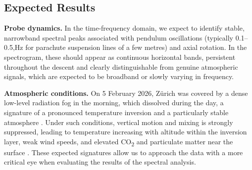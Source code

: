 \subsection{Expected Results}

\noindent  \textbf{Probe dynamics.} In the time-frequency domain, we expect to identify stable, narrowband spectral peaks associated with pendulum oscillations (typically 0.1–0.5,Hz for parachute suspension lines of a few metres) and axial rotation. In the spectrogram, these should appear as continuous horizontal bands, persistent throughout the descent and clearly distinguishable from genuine atmospheric signals, which are expected to be broadband or slowly varying in frequency.

\noindent \textbf{Atmospheric conditions.} On 5 February 2026, Zürich was covered by a dense low-level radiation fog in the morning, which dissolved during the day, a signature of a pronounced temperature inversion and a particularly stable atmosphere \citep{meteoswiss_opendata}. Under such conditions, vertical motion and mixing is strongly suppressed, leading to temperature increasing with altitude within the inversion layer, weak wind speeds, and elevated CO\textsubscript{2} and particulate matter near the surface \citep{lohmann2024}. These expected signatures allow us to approach the data with a more critical eye when evaluating the results of the spectral analysis.